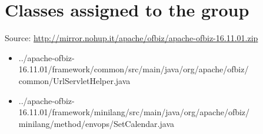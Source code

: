 \section{Classes assigned to the group}
Source: \url{http://mirror.nohup.it/apache/ofbiz/apache-ofbiz-16.11.01.zip}
\begin{itemize}
    \item ../apache-ofbiz-16.11.01/framework/common/src/main/java/org/apache/ofbiz/\\common/UrlServletHelper.java
    \item ../apache-ofbiz-16.11.01/framework/minilang/src/main/java/org/apache/ofbiz/\\minilang/method/envops/SetCalendar.java
\end{itemize}
